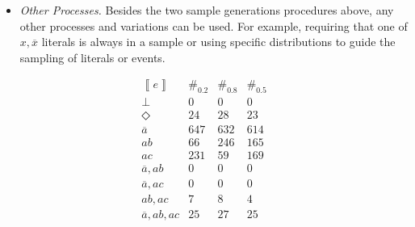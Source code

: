 \documentclass[a4paper]{article}
\newcommand{\co}[1]{\ensuremath{\overline{#1}}}     %
\newcommand{\stablecore}[1]{\ensuremath{\left\llbracket #1 \right\rrbracket}}
\newcommand{\inconsistent}{\bot}
\newcommand{\indepclass}{\ensuremath{\Diamond}}
\newcommand{\class}[1]{\ensuremath{[{#1}]_{\sim}}}
\begin{document}
\begin{itemize}
\item \emph{Other Processes.} Besides the two sample generations
  procedures above, any other processes and variations can be used.
  For example, requiring that one of \(x, \co{x}\) literals is always
  in a sample or using specific distributions to guide the sampling of
  literals or events.

\end{itemize}

\begin{table}[t]
    \begin{center}
        \[
            \begin{array}{l|ccc}
                \stablecore{e}
                 & \#_{0.2}
                 & \#_{0.8}
                 & \#_{0.5}
                \\
                \hline
                \inconsistent
                 & 0
                 & 0
                 & 0        \\[2pt]
                \indepclass
                 & 24
                 & 28
                 & 23       \\[2pt]
                \co{a}
                 & 647
                 & 632
                 & 614      \\[2pt]
                ab
                 & 66
                 & 246
                 & 165      \\[2pt]
                ac
                 & 231
                 & 59
                 & 169      \\[2pt]
                \co{a}, ab
                 & 0
                 & 0
                 & 0        \\[2pt]
                \co{a}, ac
                 & 0
                 & 0
                 & 0
                \\[2pt]
                ab, ac
                 & 7
                 & 8
                 & 4        \\[2pt]
                \co{a}, ab, ac
                 & 25
                 & 27
                 & 25\end{array}
        \]
    \end{center}

    \caption{\emph{Experiments 2 and 3.} Results from experiments, each with \(n=1000\) samples generated following the \emph{Model+Noise} procedure, with parameters \(\alpha = 0.1, \beta = 0.3, \gamma = 0.8\) (Experiment 2:
    bias to \(ab\).) and \(\gamma=0.5\) (Experiment 3: balanced \(ab\) and \(ac\).).  Empirical distributions are represented by the random variables \(S_{0.8}\) and \(S_{0.5}\) respectively.  Data from experience \cref{tab:sbf.example} is also included, and denoted by \(S_{0.2}\), to provide reference.  Columns \(\#_{0.2}\), \(\#_{0.8}\) and \(\#_{0.5}\)
    contain \(\#\set{S_{0.2} \in \class{e}}\), \(\#\set{S_{0.8} \in \class{e}}\)
    and \(\#\set{S_{0.5} \in \class{e}}\), the respective number of events in each class.}\label{tab:sbf.examples.2.3}
\end{table}
\end{document}
